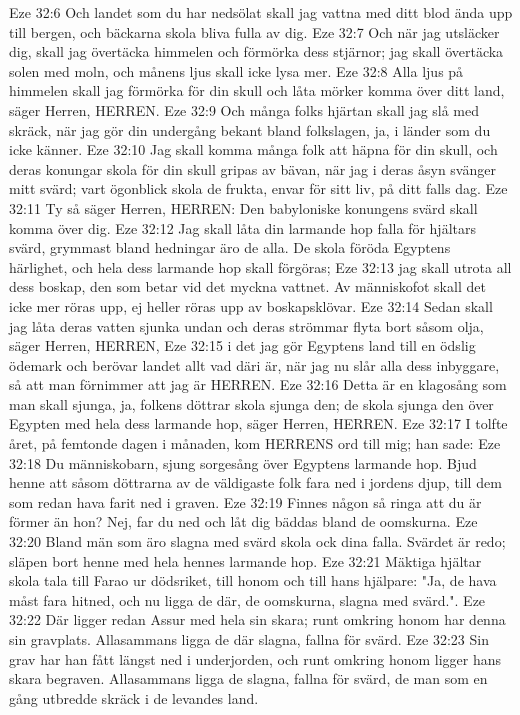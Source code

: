 Eze 32:6  Och landet som du har nedsölat skall jag vattna med ditt blod ända upp till bergen, och bäckarna skola bliva fulla av dig.
Eze 32:7  Och när jag utsläcker dig, skall jag övertäcka himmelen och förmörka dess stjärnor; jag skall övertäcka solen med moln, och månens ljus skall icke lysa mer.
Eze 32:8  Alla ljus på himmelen skall jag förmörka för din skull och låta mörker komma över ditt land, säger Herren, HERREN.
Eze 32:9  Och många folks hjärtan skall jag slå med skräck, när jag gör din undergång bekant bland folkslagen, ja, i länder som du icke känner.
Eze 32:10  Jag skall komma många folk att häpna för din skull, och deras konungar skola för din skull gripas av bävan, när jag i deras åsyn svänger mitt svärd; vart ögonblick skola de frukta, envar för sitt liv, på ditt falls dag.
Eze 32:11  Ty så säger Herren, HERREN: Den babyloniske konungens svärd skall komma över dig.
Eze 32:12  Jag skall låta din larmande hop falla för hjältars svärd, grymmast bland hedningar äro de alla. De skola föröda Egyptens härlighet, och hela dess larmande hop skall förgöras;
Eze 32:13  jag skall utrota all dess boskap, den som betar vid det myckna vattnet. Av människofot skall det icke mer röras upp, ej heller röras upp av boskapsklövar.
Eze 32:14  Sedan skall jag låta deras vatten sjunka undan och deras strömmar flyta bort såsom olja, säger Herren, HERREN,
Eze 32:15  i det jag gör Egyptens land till en ödslig ödemark och berövar landet allt vad däri är, när jag nu slår alla dess inbyggare, så att man förnimmer att jag är HERREN.
Eze 32:16  Detta är en klagosång som man skall sjunga, ja, folkens döttrar skola sjunga den; de skola sjunga den över Egypten med hela dess larmande hop, säger Herren, HERREN.
Eze 32:17  I tolfte året, på femtonde dagen i månaden, kom HERRENS ord till mig; han sade:
Eze 32:18  Du människobarn, sjung sorgesång över Egyptens larmande hop. Bjud henne att såsom döttrarna av de väldigaste folk fara ned i jordens djup, till dem som redan hava farit ned i graven.
Eze 32:19  Finnes någon så ringa att du är förmer än hon? Nej, far du ned och låt dig bäddas bland de oomskurna.
Eze 32:20  Bland män som äro slagna med svärd skola ock dina falla. Svärdet är redo; släpen bort henne med hela hennes larmande hop.
Eze 32:21  Mäktiga hjältar skola tala till Farao ur dödsriket, till honom och till hans hjälpare: "Ja, de hava måst fara hitned, och nu ligga de där, de oomskurna, slagna med svärd.".
Eze 32:22  Där ligger redan Assur med hela sin skara; runt omkring honom har denna sin gravplats. Allasammans ligga de där slagna, fallna för svärd.
Eze 32:23  Sin grav har han fått längst ned i underjorden, och runt omkring honom ligger hans skara begraven. Allasammans ligga de slagna, fallna för svärd, de man som en gång utbredde skräck i de levandes land.
